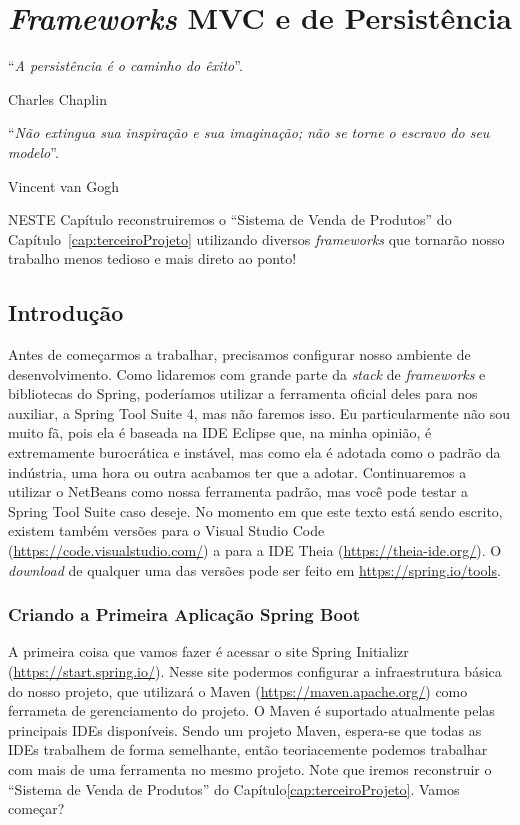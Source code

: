 \chapter{\textit{Frameworks} MVC e de Persistência}\label{cap:frameworksPersistencia}
\epigraph{``\textit{A persistência é o caminho do êxito}''.}{Charles Chaplin}
\epigraph{``\textit{Não extingua sua inspiração e sua imaginação; não se torne o escravo do seu modelo}''.}{Vincent van Gogh}

\lettrine[lines=4, lhang=0.1, lraise=0, loversize=0.2, findent=0.1em]{\textcolor{corTema}{N}}{ESTE} Capítulo reconstruiremos o ``Sistema de Venda de Produtos'' do Capítulo~\ref{cap:terceiroProjeto} utilizando diversos \textit{frameworks} que tornarão nosso trabalho menos tedioso e mais direto ao ponto!

\vfill

\section{Introdução}

Antes de começarmos a trabalhar, precisamos configurar nosso ambiente de desenvolvimento. Como lidaremos com grande parte da \textit{stack} de \textit{frameworks} e bibliotecas do Spring, poderíamos utilizar a ferramenta oficial deles para nos auxiliar, a Spring Tool Suite 4, mas não faremos isso. Eu particularmente não sou muito fã, pois ela é baseada na IDE Eclipse que, na minha opinião, é extremamente burocrática e instável, mas como ela é adotada como o padrão da indústria, uma hora ou outra acabamos ter que a adotar. Continuaremos a utilizar o NetBeans como nossa ferramenta padrão, mas você pode testar a Spring Tool Suite caso deseje. No momento em que este texto está sendo escrito, existem também versões para o Visual Studio Code (\url{https://code.visualstudio.com/}) a para a IDE Theia (\url{https://theia-ide.org/}). O \textit{download} de qualquer uma das versões pode ser feito em \url{https://spring.io/tools}.


\subsection{Criando a Primeira Aplicação Spring Boot}

A primeira coisa que vamos fazer é acessar o site Spring Initializr (\url{https://start.spring.io/}). Nesse site podermos configurar a infraestrutura básica do nosso projeto, que utilizará o Maven (\url{https://maven.apache.org/}) como ferrameta de gerenciamento do projeto. O Maven é suportado atualmente pelas principais IDEs disponíveis. Sendo um projeto Maven, espera-se que todas as IDEs trabalhem de forma semelhante, então teoriacemente podemos trabalhar com mais de uma ferramenta no mesmo projeto. Note que iremos reconstruir o ``Sistema de Venda de Produtos'' do Capítulo\ref{cap:terceiroProjeto}. Vamos começar?

